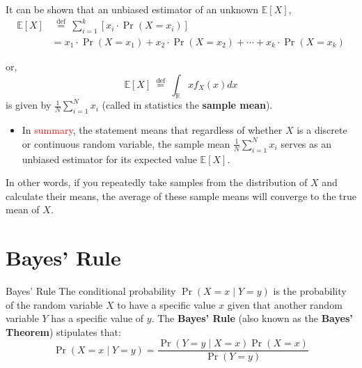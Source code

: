 \documentclass[9pt,dvipsnames]{beamer}
\begin{document}
\begin{frame}
	It can be shown that an unbiased estimator of an unknown $\mathbb{E}[X]$,
	$$
		\begin{aligned}
			\mathbb{E}[X] & \stackrel{\text { def }}{=} \sum_{i=1}^{k}\left[x_{i} \cdot \operatorname{Pr}\left(X=x_{i}\right)\right]                                                      \\
			              & =x_{1} \cdot \operatorname{Pr}\left(X=x_{1}\right)+x_{2} \cdot \operatorname{Pr}\left(X=x_{2}\right)+\cdots+x_{k} \cdot \operatorname{Pr}\left(X=x_{k}\right)
		\end{aligned}
	$$

	or,
	$$
		\mathbb{E}[X] \stackrel{\text { def }}{=} \int_{\mathbb{R}} x f_{X}(x) d x
	$$
	is given by $\frac{1}{N} \sum_{i=1}^{N} x_{i}$ (called in statistics the\textbf{ sample mean}).
	\begin{itemize}
		\item 	In \textcolor{red}{summary}, the statement means that regardless of whether \(X\) is a discrete or continuous random variable, the sample mean
		      \(\frac{1}{N} \sum_{i=1}^{N} x_{i}\) serves as an unbiased estimator for its expected value \(\mathbb{E}[X]\).
	\end{itemize}
	In other words, if you repeatedly take samples from the distribution of \(X\) and calculate their means, the average of these sample means will converge to the true mean of \(X\).
\end{frame}

\section{Bayes' Rule}
\begin{frame}{Bayes' Rule}
	The conditional probability $\operatorname{Pr}(X=x \mid Y=y)$ is the probability of the random variable $X$ to have a specific value $x$ given that another random variable $Y$ has a specific value of $y$. The \textbf{Bayes' Rule} (also known as the \textbf{Bayes' Theorem}) stipulates that:
	$$
		\operatorname{Pr}(X=x \mid Y=y)=\frac{\operatorname{Pr}(Y=y \mid X=x) \operatorname{Pr}(X=x)}{\operatorname{Pr}(Y=y)}
	$$
\end{frame}
\end{document}
